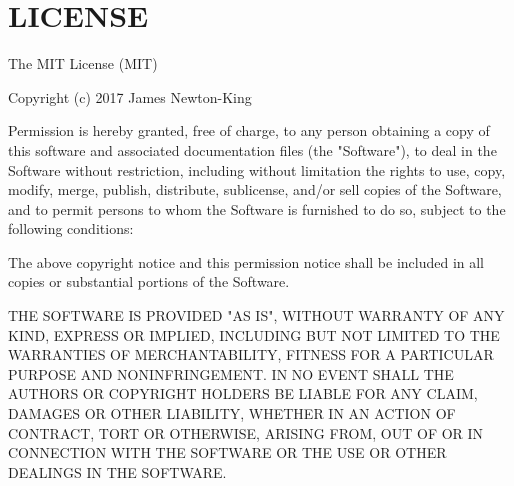 \chapter{LICENSE}
\hypertarget{md_packages_2_newtonsoft_8_json_8_bson_81_80_82_2_l_i_c_e_n_s_e}{}\label{md_packages_2_newtonsoft_8_json_8_bson_81_80_82_2_l_i_c_e_n_s_e}
The MIT License (MIT)

Copyright (c) 2017 James Newton-\/\+King

Permission is hereby granted, free of charge, to any person obtaining a copy of this software and associated documentation files (the "{}\+Software"{}), to deal in the Software without restriction, including without limitation the rights to use, copy, modify, merge, publish, distribute, sublicense, and/or sell copies of the Software, and to permit persons to whom the Software is furnished to do so, subject to the following conditions\+:

The above copyright notice and this permission notice shall be included in all copies or substantial portions of the Software.

THE SOFTWARE IS PROVIDED "{}\+AS IS"{}, WITHOUT WARRANTY OF ANY KIND, EXPRESS OR IMPLIED, INCLUDING BUT NOT LIMITED TO THE WARRANTIES OF MERCHANTABILITY, FITNESS FOR A PARTICULAR PURPOSE AND NONINFRINGEMENT. IN NO EVENT SHALL THE AUTHORS OR COPYRIGHT HOLDERS BE LIABLE FOR ANY CLAIM, DAMAGES OR OTHER LIABILITY, WHETHER IN AN ACTION OF CONTRACT, TORT OR OTHERWISE, ARISING FROM, OUT OF OR IN CONNECTION WITH THE SOFTWARE OR THE USE OR OTHER DEALINGS IN THE SOFTWARE. 
